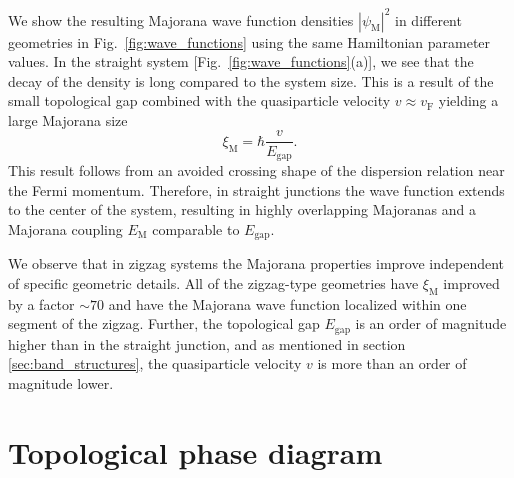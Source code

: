 We show the resulting Majorana wave function densities $\left| \psi_\textrm{M} \right|^2$ in different geometries in Fig.~\ref{fig:wave_functions} using the same Hamiltonian parameter values.
In the straight system [Fig.~\ref{fig:wave_functions}(a)], we see that the decay of the density is long compared to the system size.
This is a result of the small topological gap combined with the quasiparticle velocity $v \approx v_\textrm{F}$ yielding a large Majorana size
\begin{equation}
\label{eq:xi_M}
\xi_\textrm{M}=\hbar \frac{v}{E_\textrm{gap}}.
\end{equation}
This result follows from an avoided crossing shape of the dispersion relation near the Fermi momentum.
Therefore, in straight junctions the wave function extends to the center of the system, resulting in highly overlapping Majoranas and a Majorana coupling $E_\textrm{M}$ comparable to $E_\textrm{gap}$.

We observe that in zigzag systems the Majorana properties improve independent of specific geometric details.
All of the zigzag-type geometries have $\xi_\textrm{M}$ improved by a factor $\sim 70$ and have the Majorana wave function localized within one segment of the zigzag.
Further, the topological gap $E_\textrm{gap}$ is an order of magnitude higher than in the straight junction, and as mentioned in section \ref{sec:band_structures}, the quasiparticle velocity $v$ is more than an order of magnitude lower.


\section{Topological phase diagram}

